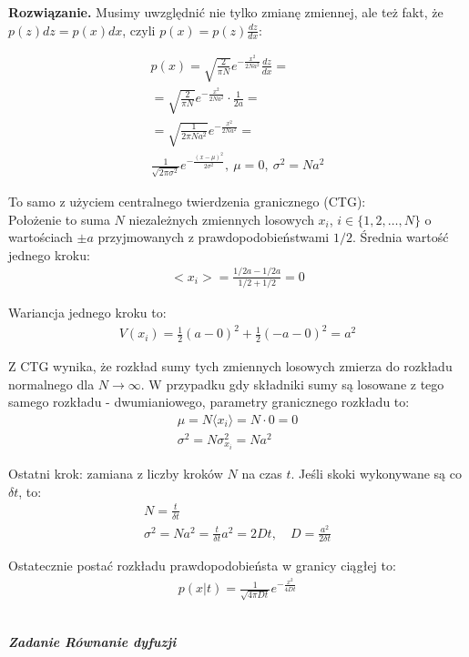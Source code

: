 \documentclass[11pt,a4paper]{article}
\newcounter{zadanie}\newcommand{\zadanie}[1][]{\addtocounter{zadanie}{1} ~\\  {\bf \emph{Zadanie \arabic{zadanie} #1 }} \\}
\newenvironment{solution}{\vspace{1cm} \par\textbf{Rozwiązanie.} \vspace{1cm}}{}
\begin{document}
\begin{solution}
Musimy uwzględnić nie tylko zmianę zmiennej, ale też fakt, 
że $p(z)dz = p(x)dx$, czyli $p(x) = p(z) \frac{dz}{dx}$:

\begin{align*}
    p(x) = \sqrt{\frac{2}{\pi N}} e^{-\frac{x^2}{2Na^2}} \frac{dz}{dx}  = \\
        = \sqrt{\frac{2}{\pi N}} e^{-\frac{x^2}{2Na^2}} \cdot \frac{1}{2a} = \\
        = \sqrt{\frac{1}{2\pi Na^2}} e^{-\frac{x^2}{2Na^2}} = \\
    \frac{1}{\sqrt{2\pi \sigma^2}} e^{-\frac{(x - \mu)^2}{2\sigma^2}}, 
    ~ \mu = 0, ~ \sigma^2 = Na^2
\end{align*}

\vspace{0.5cm}
To samo z użyciem centralnego twierdzenia granicznego (CTG):\\
Położenie to suma $N$ niezależnych zmiennych losowych $x_{i}$, $i \in \{1,2,\ldots,N\}$ 
o wartościach $\pm a$ przyjmowanych z prawdopodobieństwami $1/2$.
Średnia wartość jednego kroku:
\begin{align*}
    <x_{i}> = \frac{1/2a - 1/2a}{1/2 + 1/2} = 0
\end{align*}

Wariancja jednego kroku to:
\begin{align*}
    V(x_{i}) =  \frac{1}{2} (a - 0)^2 + \frac{1}{2} (-a - 0)^2 = a^2
\end{align*}


Z CTG wynika, że rozkład sumy tych zmiennych losowych zmierza do rozkładu 
normalnego dla $N \to \infty$. W przypadku gdy składniki sumy są losowane 
z tego samego rozkładu - dwumianiowego, parametry granicznego rozkładu to:
\begin{align*}
    \mu = N \langle x_{i} \rangle = N \cdot 0 = 0 \\
    \sigma^2 = N \sigma_{x_{i}}^{2} = N a^2
\end{align*}

Ostatni krok: zamiana z liczby kroków $N$ na czas $t$. 
Jeśli skoki wykonywane są co $\delta t$, to:
\begin{align*}
    N = \frac{t}{\delta t} \\
    \sigma^2 = Na^2 = \frac{t}{\delta t} a^2 = 2Dt, \quad D = \frac{a^2}{2\delta t}
\end{align*}

Ostatecznie postać rozkładu prawdopodobieństa w granicy ciągłej to:
\begin{align*}
    p(x|t) = \frac{1}{\sqrt{4\pi Dt}} e^{-\frac{x^2}{4Dt}}
\end{align*}

\newpage
\end{solution}
\zadanie[Równanie dyfuzji]
\end{document}
